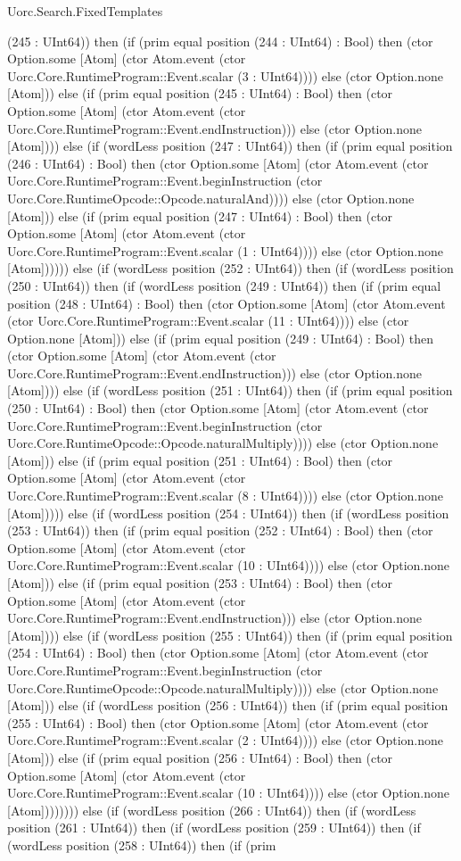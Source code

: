 \begin{lexlean}{Uorc.Search.FixedTemplates}
\begin{semanticmodule}
{(245 : UInt64)) then (if (prim equal position (244 : UInt64) : Bool) then (ctor Option.some [Atom] (ctor Atom.event (ctor Uorc.Core.RuntimeProgram::Event.scalar (3 : UInt64)))) else (ctor Option.none [Atom])) else (if (prim equal position (245 : UInt64) : Bool) then (ctor Option.some [Atom] (ctor Atom.event (ctor Uorc.Core.RuntimeProgram::Event.endInstruction))) else (ctor Option.none [Atom]))) else (if (wordLess position (247 : UInt64)) then (if (prim equal position (246 : UInt64) : Bool) then (ctor Option.some [Atom] (ctor Atom.event (ctor Uorc.Core.RuntimeProgram::Event.beginInstruction (ctor Uorc.Core.RuntimeOpcode::Opcode.naturalAnd)))) else (ctor Option.none [Atom])) else (if (prim equal position (247 : UInt64) : Bool) then (ctor Option.some [Atom] (ctor Atom.event (ctor Uorc.Core.RuntimeProgram::Event.scalar (1 : UInt64)))) else (ctor Option.none [Atom]))))) else (if (wordLess position (252 : UInt64)) then (if (wordLess position (250 : UInt64)) then (if (wordLess position (249 : UInt64)) then (if (prim equal position (248 : UInt64) : Bool) then (ctor Option.some [Atom] (ctor Atom.event (ctor Uorc.Core.RuntimeProgram::Event.scalar (11 : UInt64)))) else (ctor Option.none [Atom])) else (if (prim equal position (249 : UInt64) : Bool) then (ctor Option.some [Atom] (ctor Atom.event (ctor Uorc.Core.RuntimeProgram::Event.endInstruction))) else (ctor Option.none [Atom]))) else (if (wordLess position (251 : UInt64)) then (if (prim equal position (250 : UInt64) : Bool) then (ctor Option.some [Atom] (ctor Atom.event (ctor Uorc.Core.RuntimeProgram::Event.beginInstruction (ctor Uorc.Core.RuntimeOpcode::Opcode.naturalMultiply)))) else (ctor Option.none [Atom])) else (if (prim equal position (251 : UInt64) : Bool) then (ctor Option.some [Atom] (ctor Atom.event (ctor Uorc.Core.RuntimeProgram::Event.scalar (8 : UInt64)))) else (ctor Option.none [Atom])))) else (if (wordLess position (254 : UInt64)) then (if (wordLess position (253 : UInt64)) then (if (prim equal position (252 : UInt64) : Bool) then (ctor Option.some [Atom] (ctor Atom.event (ctor Uorc.Core.RuntimeProgram::Event.scalar (10 : UInt64)))) else (ctor Option.none [Atom])) else (if (prim equal position (253 : UInt64) : Bool) then (ctor Option.some [Atom] (ctor Atom.event (ctor Uorc.Core.RuntimeProgram::Event.endInstruction))) else (ctor Option.none [Atom]))) else (if (wordLess position (255 : UInt64)) then (if (prim equal position (254 : UInt64) : Bool) then (ctor Option.some [Atom] (ctor Atom.event (ctor Uorc.Core.RuntimeProgram::Event.beginInstruction (ctor Uorc.Core.RuntimeOpcode::Opcode.naturalMultiply)))) else (ctor Option.none [Atom])) else (if (wordLess position (256 : UInt64)) then (if (prim equal position (255 : UInt64) : Bool) then (ctor Option.some [Atom] (ctor Atom.event (ctor Uorc.Core.RuntimeProgram::Event.scalar (2 : UInt64)))) else (ctor Option.none [Atom])) else (if (prim equal position (256 : UInt64) : Bool) then (ctor Option.some [Atom] (ctor Atom.event (ctor Uorc.Core.RuntimeProgram::Event.scalar (10 : UInt64)))) else (ctor Option.none [Atom]))))))) else (if (wordLess position (266 : UInt64)) then (if (wordLess position (261 : UInt64)) then (if (wordLess position (259 : UInt64)) then (if (wordLess position (258 : UInt64)) then (if (prim }
\end{semanticmodule}
\end{lexlean}
